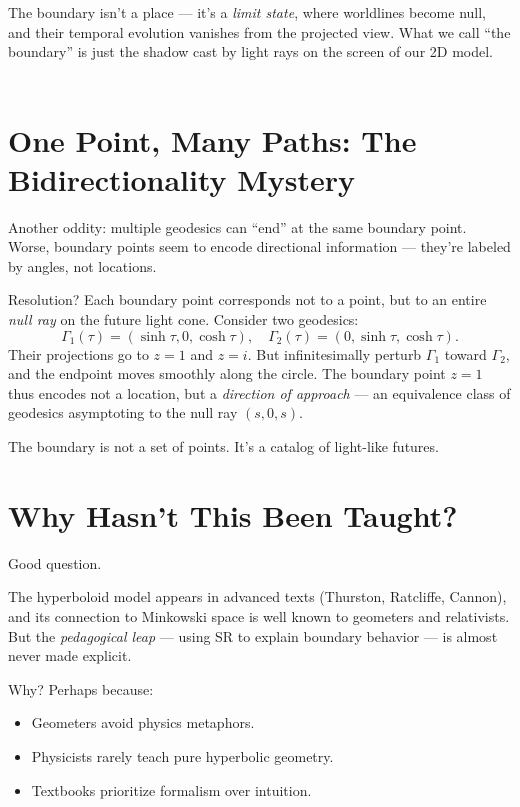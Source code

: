 \documentclass[10pt]{article}
\begin{document}
The boundary isn't a place --- it's a \emph{limit state}, where worldlines become null, and their temporal evolution vanishes from the projected view. What we call ``the boundary'' is just the shadow cast by light rays on the screen of our 2D model.
\\
\\
\section*{One Point, Many Paths: The Bidirectionality Mystery}

Another oddity: multiple geodesics can ``end'' at the same boundary point. Worse, boundary points seem to encode directional information --- they're labeled by angles, not locations.

Resolution? Each boundary point corresponds not to a point, but to an entire \emph{null ray} on the future light cone. Consider two geodesics:
\begin{equation*}
\Gamma_1(\tau) = (\sinh\tau, 0, \cosh\tau), \quad \Gamma_2(\tau) = (0, \sinh\tau, \cosh\tau).
\end{equation*}
Their projections go to $z=1$ and $z=i$. But infinitesimally perturb $\Gamma_1$ toward $\Gamma_2$, and the endpoint moves smoothly along the circle. The boundary point $z=1$ thus encodes not a location, but a \emph{direction of approach} --- an equivalence class of geodesics asymptoting to the null ray $(s, 0, s)$.

The boundary is not a set of points. It's a catalog of light-like futures.

\section*{Why Hasn't This Been Taught?}

Good question.

The hyperboloid model appears in advanced texts (Thurston, Ratcliffe, Cannon), and its connection to Minkowski space is well known to geometers and relativists. But the \emph{pedagogical leap} --- using SR to explain boundary behavior --- is almost never made explicit.

Why? Perhaps because:

\begin{itemize}
\item Geometers avoid physics metaphors.
\item Physicists rarely teach pure hyperbolic geometry.
\item Textbooks prioritize formalism over intuition.
\end{itemize}
\end{document}
